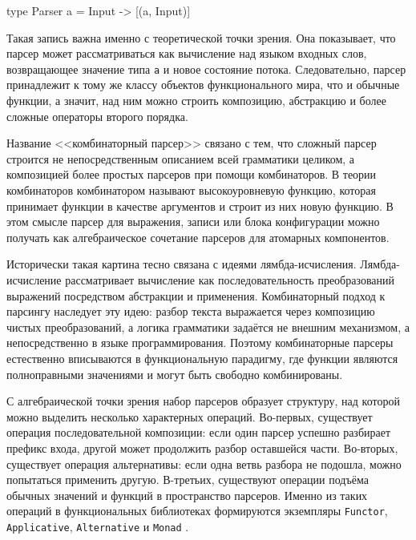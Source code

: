 \documentclass[a4paper,12pt]{article}
\begin{document}
\begin{flushleft}
\label{lst:parser-abstract}
\begin{MyCodes}
type Parser a = Input -> [(a, Input)]
\end{MyCodes}
\end{flushleft}

Такая запись важна именно с теоретической точки зрения. Она показывает, что парсер
может рассматриваться как вычисление над языком входных слов, возвращающее значение
типа \texttt{a} и новое состояние потока. Следовательно, парсер принадлежит к тому же
классу объектов функционального мира, что и обычные функции, а значит, над ним можно строить
композицию, абстракцию и более сложные операторы второго порядка.

Название <<комбинаторный парсер>> связано с тем, что сложный парсер строится не
непосредственным описанием всей грамматики целиком, а композицией более простых
парсеров при помощи комбинаторов. В теории комбинаторов комбинатором называют
высокоуровневую функцию, которая принимает функции в качестве аргументов и строит из них
новую функцию. В этом смысле парсер для выражения, записи или блока конфигурации можно
получать как алгебраическое сочетание парсеров для атомарных компонентов.

Исторически такая картина тесно связана с идеями лямбда-исчисления. Лямбда-исчисление
рассматривает вычисление как последовательность преобразований выражений посредством
абстракции и применения. Комбинаторный подход к парсингу наследует эту идею: разбор
текста выражается через композицию чистых преобразований, а логика грамматики задаётся
не внешним механизмом, а непосредственно в языке программирования. Поэтому комбинаторные
парсеры естественно вписываются в функциональную парадигму, где функции являются
полноправными значениями и могут быть свободно комбинированы.

С алгебраической точки зрения набор парсеров образует структуру, над которой можно
выделить несколько характерных операций. Во-первых, существует операция последовательной
композиции: если один парсер успешно разбирает префикс входа, другой может продолжить
разбор оставшейся части. Во-вторых, существует операция альтернативы: если одна ветвь
разбора не подошла, можно попытаться применить другую. В-третьих, существуют операции
подъёма обычных значений и функций в пространство парсеров. Именно из таких операций в
функциональных библиотеках формируются экземпляры \texttt{Functor}, \texttt{Applicative},
\texttt{Alternative} и \texttt{Monad} \cite{mcbride_paterson_2008}.
\end{document}
